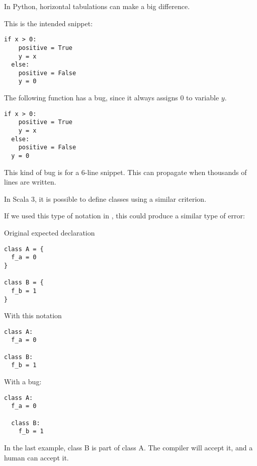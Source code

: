 In Python, horizontal tabulations can make a big difference.

This is the intended snippet:

\begin{lstlisting}[label={lst:snippetInPython1}]
  if x > 0:
    positive = True
    y = x
  else:
    positive = False
    y = 0
\end{lstlisting}


The following function has a bug, since it always assigns 0 to variable $y$.

\begin{lstlisting}[label={lst:snippetInPython2}]
  if x > 0:
    positive = True
    y = x
  else:
    positive = False
  y = 0
\end{lstlisting}

This kind of bug is for a 6-line snippet.
This can propagate when thousands of lines are written.

In Scala 3, it is possible to define classes using a similar criterion.

If we used this type of notation in \Soda, this could produce a similar type of error:

Original expected declaration

\begin{lstlisting}[label={lst:classesWithBraces}]
class A = {
  f_a = 0
}

class B = {
  f_b = 1
}
\end{lstlisting}

With this notation
\begin{lstlisting}[label={lst:classesWithColons}]
class A:
  f_a = 0

class B:
  f_b = 1
\end{lstlisting}

With a bug:
\begin{lstlisting}[label={lst:classesWithColonsAndMistake}]
class A:
  f_a = 0

  class B:
    f_b = 1
\end{lstlisting}

In the last example, class B is part of class A.
The compiler will accept it, and a human can accept it.

